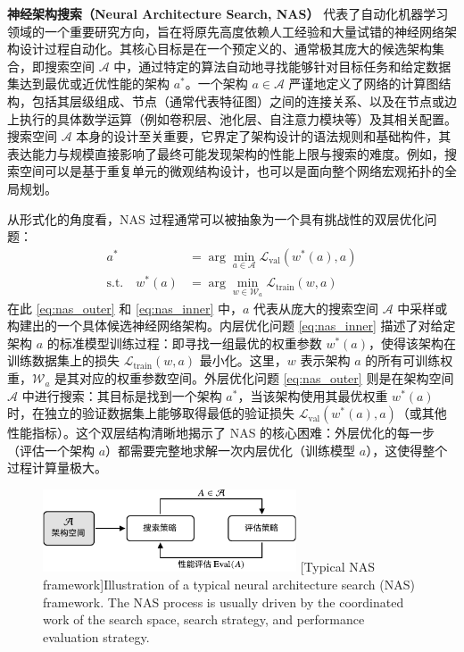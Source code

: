 \documentclass[../main.tex]{subfiles}
\begin{document}
\label{sec:ch2-3-2-neural-architecture-search}

\textbf{神经架构搜索（Neural Architecture Search, NAS）} 代表了自动化机器学习领域的一个重要研究方向，旨在将原先高度依赖人工经验和大量试错的神经网络架构设计过程自动化。其核心目标是在一个预定义的、通常极其庞大的候选架构集合，即搜索空间 $\mathcal{A}$ 中，通过特定的算法自动地寻找能够针对目标任务和给定数据集达到最优或近优性能的架构 $a^*$。一个架构 $a \in \mathcal{A}$ 严谨地定义了网络的计算图结构，包括其层级组成、节点（通常代表特征图）之间的连接关系、以及在节点或边上执行的具体数学运算（例如卷积层、池化层、自注意力模块等）及其相关配置。搜索空间 $\mathcal{A}$ 本身的设计至关重要，它界定了架构设计的语法规则和基础构件，其表达能力与规模直接影响了最终可能发现架构的性能上限与搜索的难度。例如，搜索空间可以是基于重复单元的微观结构设计，也可以是面向整个网络宏观拓扑的全局规划\cite{neuralarchitecturesearch_elsken_2019}。

从形式化的角度看，NAS 过程通常可以被抽象为一个具有挑战性的双层优化问题：
\begin{align}
	a^{*}                      & = \arg\min_{a \in \mathcal{A}} \mathcal{L}_\mathrm{val}(w^{*}(a), a) \label{eq:nas_outer} \\
	\text{s.t.} \quad w^{*}(a) & = \arg\min_{w \in \mathcal{W}_a} \mathcal{L}_\mathrm{train}(w, a) \label{eq:nas_inner}
\end{align}
在此 \eqref{eq:nas_outer} 和 \eqref{eq:nas_inner} 中，$a$ 代表从庞大的搜索空间 $\mathcal{A}$ 中采样或构建出的一个具体候选神经网络架构。内层优化问题 \eqref{eq:nas_inner} 描述了对给定架构 $a$ 的标准模型训练过程：即寻找一组最优的权重参数 $w^{*}(a)$，使得该架构在训练数据集上的损失 $\mathcal{L}_\mathrm{train}(w, a)$ 最小化。这里，$w$ 表示架构 $a$ 的所有可训练权重，$\mathcal{W}_a$ 是其对应的权重参数空间。外层优化问题 \eqref{eq:nas_outer} 则是在架构空间 $\mathcal{A}$ 中进行搜索：其目标是找到一个架构 $a^*$，当该架构使用其最优权重 $w^*(a)$ 时，在独立的验证数据集上能够取得最低的验证损失 $\mathcal{L}_\mathrm{val}(w^{*}(a), a)$（或其他性能指标）。这个双层结构清晰地揭示了 NAS 的核心困难：外层优化的每一步（评估一个架构 $a$）都需要完整地求解一次内层优化（训练模型 $a$），这使得整个过程计算量极大\cite{dartsdifferentiablearchitecture_liu_2019}。

\begin{figure}
	\centering
	\includegraphics[width=0.67\textwidth]{nas-bilevel.pdf}
	[Typical NAS framework]{Illustration of a typical neural architecture search (NAS) framework. The NAS process is usually driven by the coordinated work of the search space, search strategy, and performance evaluation strategy.}
	\label{fig:nas-bilevel-optimization}
\end{figure}
\end{document}
